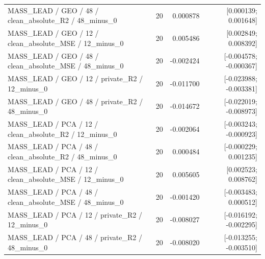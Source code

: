 \begin{longtable}{p{.56\linewidth}rrr}
MASS\_LEAD / GEO / 48 / clean\_absolute\_R2 / 48\_minus\_0 & 20 & 0.000878 & [0.000139; 0.001648] \\
MASS\_LEAD / GEO / 12 / clean\_absolute\_MSE / 12\_minus\_0 & 20 & 0.005486 & [0.002849; 0.008392] \\
MASS\_LEAD / GEO / 48 / clean\_absolute\_MSE / 48\_minus\_0 & 20 & -0.002424 & [-0.004578; -0.000367] \\
MASS\_LEAD / GEO / 12 / private\_R2 / 12\_minus\_0 & 20 & -0.011700 & [-0.023988; -0.003381] \\
MASS\_LEAD / GEO / 48 / private\_R2 / 48\_minus\_0 & 20 & -0.014672 & [-0.022019; -0.008973] \\
MASS\_LEAD / PCA / 12 / clean\_absolute\_R2 / 12\_minus\_0 & 20 & -0.002064 & [-0.003243; -0.000923] \\
MASS\_LEAD / PCA / 48 / clean\_absolute\_R2 / 48\_minus\_0 & 20 & 0.000484 & [-0.000229; 0.001235] \\
MASS\_LEAD / PCA / 12 / clean\_absolute\_MSE / 12\_minus\_0 & 20 & 0.005605 & [0.002523; 0.008762] \\
MASS\_LEAD / PCA / 48 / clean\_absolute\_MSE / 48\_minus\_0 & 20 & -0.001420 & [-0.003483; 0.000512] \\
MASS\_LEAD / PCA / 12 / private\_R2 / 12\_minus\_0 & 20 & -0.008027 & [-0.016192; -0.002295] \\
MASS\_LEAD / PCA / 48 / private\_R2 / 48\_minus\_0 & 20 & -0.008020 & [-0.013255; -0.003510] \\
\bottomrule\end{longtable}
